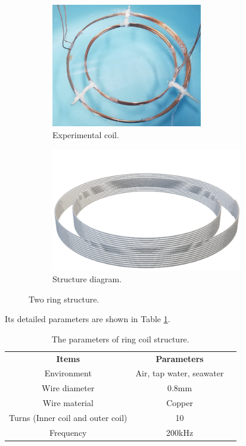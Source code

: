 \begin{figure}[htbp]
    \begin{subfigure}{0.5\textwidth}
        \centering
        \includegraphics[width=0.9\linewidth, height=5.4cm]{images/3_two_ring_coil.png}
        \caption{Experimental coil.}
        \label{fig:subim1}
    \end{subfigure}
    \begin{subfigure}{0.5\textwidth}
        \centering
        \includegraphics[width=0.9\linewidth, height=5.4cm]{images/3_two_ring_coil_structure.png}
        \caption{Structure diagram.}
        \label{fig:subim2}
    \end{subfigure}

    \caption{Two ring structure.}
    \label{fig:3_two_ring_coil}
\end{figure}

Its detailed parameters are shown in Table \ref{table:ring coil parameters}.

\begin{table}[htbp]
    \centering
    \caption{The parameters of ring coil structure.}
    \begin{tabular}{ c|cc }
        \thickhline
        \textbf{Items}                     & \textbf{Parameters}      \\
        \thickhline
        Environment                        & Air, tap water, seawater \\ \hline
        Wire diameter                      & 0.8mm                    \\ \hline
        Wire material                      & Copper                   \\ \hline
        Turns (Inner coil and outer coil) & 10                       \\ \hline
        Frequency                          & 200kHz                   \\ \hline
    \end{tabular}
    \label{table:ring coil parameters}
\end{table}


